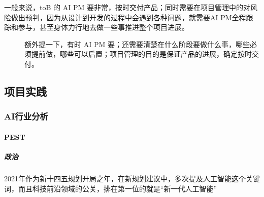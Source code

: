\documentclass[letterpaper,10pt,english]{sphinxmanual}
\begin{document}
\begin{center}\end{center} 
\begin{description}
\item[{一般来说，toB 的 AI PM 要非常，按时交付产品；同时需要在项目管理中的对风险做出预判，因为从设计到开发的过程中会遇到各种问题，就需要AI PM全程跟踪和参与，甚至身体力行地去做一些事推进整个项目进展。}] \leavevmode
额外提一下，有时 AI PM
要；还需要清楚在什么阶段要做什么事，哪些必须提前做，哪些可以后置；项目管理的目的是保证产品的进展，确定按时交付。

\end{description}


\subsection{项目实践}
\label{\detokenize{chapter_project/index:chap-project}}\label{\detokenize{chapter_project/index:id1}}\label{\detokenize{chapter_project/index::doc}}

\subsubsection{AI行业分析}
\label{\detokenize{chapter_project/AI_industry_analysis:ai}}\label{\detokenize{chapter_project/AI_industry_analysis::doc}}

\paragraph{PEST}
\label{\detokenize{chapter_project/AI_industry_analysis:pest}}

\subparagraph{政治}
\label{\detokenize{chapter_project/AI_industry_analysis:id1}}
2021年作为新十四五规划开局之年，在新规划建议中，多次提及人工智能这个关键词，而且科技前沿领域的公关，排在第一位的就是“新一代人工智能”%
\begin{footnote}[702]\sphinxAtStartFootnote
{}
%
\end{footnote}

%
\begin{footnote}[703]\sphinxAtStartFootnote
{}
%
\end{footnote}
\end{document}
